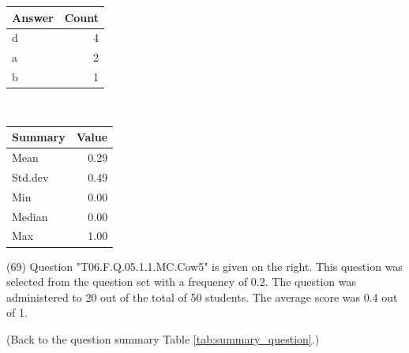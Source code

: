 \documentclass[12pt,english,nohyper]{tufte-handout}\usepackage[]{graphicx}\usepackage[]{color}
\begin{document}
\begin{center}%
\begin{tabular}{lr}
  \hline
Answer & Count \\ 
  \hline
d &   4 \\ 
  a &   2 \\ 
  b &   1 \\ 
   \hline
\end{tabular}
~~~~~~~~%
\begin{tabular}{lr}
  \hline
Summary & Value \\ 
  \hline
Mean & 0.29 \\ 
  Std.dev & 0.49 \\ 
  Min & 0.00 \\ 
  Median & 0.00 \\ 
  Max & 1.00 \\ 
   \hline
\end{tabular}
\end{center}\newpage{} (69) Question "T06.F.Q.05.1.1.MC.Cow5" is given on the right. This question was selected from the question set with a frequency of 0.2. The question was administered to 20 out of the total of 50 students. The average score was 0.4 out of 1.

 (Back to the question summary Table \ref{tab:summary_question}.)
\end{document}
